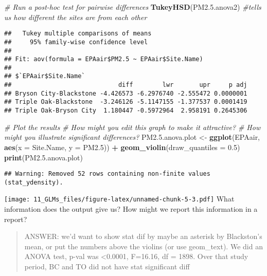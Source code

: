 \documentclass[]{article}
\newenvironment{Shaded}{\begin{snugshade}}{\end{snugshade}}
\newcommand{\KeywordTok}[1]{\textcolor[rgb]{0.13,0.29,0.53}{\textbf{#1}}}
\newcommand{\DataTypeTok}[1]{\textcolor[rgb]{0.13,0.29,0.53}{#1}}
\newcommand{\DecValTok}[1]{\textcolor[rgb]{0.00,0.00,0.81}{#1}}
\newcommand{\FloatTok}[1]{\textcolor[rgb]{0.00,0.00,0.81}{#1}}
\newcommand{\StringTok}[1]{\textcolor[rgb]{0.31,0.60,0.02}{#1}}
\newcommand{\CommentTok}[1]{\textcolor[rgb]{0.56,0.35,0.01}{\textit{#1}}}
\newcommand{\OperatorTok}[1]{\textcolor[rgb]{0.81,0.36,0.00}{\textbf{#1}}}
\newcommand{\NormalTok}[1]{#1}
\begin{document}
\begin{Shaded}
\begin{Highlighting}[]
\CommentTok{# Run a post-hoc test for pairwise differences}
\KeywordTok{TukeyHSD}\NormalTok{(PM2.}\FloatTok{5.}\NormalTok{anova2) }\CommentTok{#tells us how different the sites are from each other}
\end{Highlighting}
\end{Shaded}

\begin{verbatim}
##   Tukey multiple comparisons of means
##     95% family-wise confidence level
## 
## Fit: aov(formula = EPAair$PM2.5 ~ EPAair$Site.Name)
## 
## $`EPAair$Site.Name`
##                             diff        lwr       upr     p adj
## Bryson City-Blackstone -4.426573 -6.2976740 -2.555472 0.0000001
## Triple Oak-Blackstone  -3.246126 -5.1147155 -1.377537 0.0001419
## Triple Oak-Bryson City  1.180447 -0.5972964  2.958191 0.2645306
\end{verbatim}

\begin{Shaded}
\begin{Highlighting}[]
\CommentTok{# Plot the results}
\CommentTok{# How might you edit this graph to make it attractive?}
\CommentTok{# How might you illustrate significant differences?}
\NormalTok{PM2.}\FloatTok{5.}\NormalTok{anova.plot <-}\StringTok{ }\KeywordTok{ggplot}\NormalTok{(EPAair, }\KeywordTok{aes}\NormalTok{(}\DataTypeTok{x =}\NormalTok{ Site.Name, }\DataTypeTok{y =}\NormalTok{ PM2.}\DecValTok{5}\NormalTok{)) }\OperatorTok{+}
\StringTok{  }\KeywordTok{geom_violin}\NormalTok{(}\DataTypeTok{draw_quantiles =} \FloatTok{0.5}\NormalTok{)}
\KeywordTok{print}\NormalTok{(PM2.}\FloatTok{5.}\NormalTok{anova.plot)}
\end{Highlighting}
\end{Shaded}

\begin{verbatim}
## Warning: Removed 52 rows containing non-finite values (stat_ydensity).
\end{verbatim}

\texttt{[image: 11\_GLMs\_files/figure-latex/unnamed-chunk-5-3.pdf]} What
information does the output give us? How might we report this
information in a report?

\begin{quote}
ANSWER: we'd want to show stat dif by maybe an asterisk by Blackston's
mean, or put the numbers above the violins (or use geom\_text). We did
an ANOVA test, p-val was \textless{}0.0001, F=16.16, df = 1898. Over
that study period, BC and TO did not have stat significant diff
\end{quote}
\end{document}
